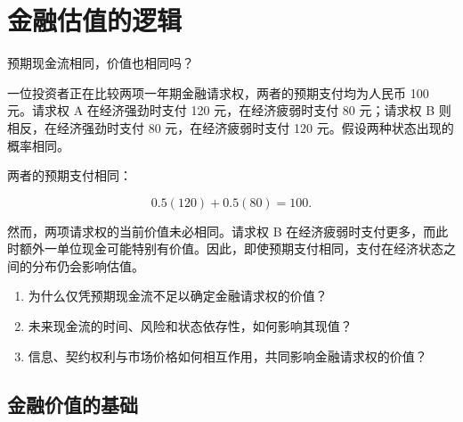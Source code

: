 \chapter{金融估值的逻辑}
\label{chap:The_Logic_of_Financial_Valuation}

\begin{openingcase}{预期现金流相同，价值也相同吗？}

一位投资者正在比较两项一年期金融请求权，两者的预期支付均为人民币 100 元。请求权 A 在经济强劲时支付 120 元，在经济疲弱时支付 80 元；请求权 B 则相反，在经济强劲时支付 80 元，在经济疲弱时支付 120 元。假设两种状态出现的概率相同。

两者的预期支付相同：

\[
0.5(120)+0.5(80)=100.
\]

然而，两项请求权的当前价值未必相同。请求权 B 在经济疲弱时支付更多，而此时额外一单位现金可能特别有价值。因此，即使预期支付相同，支付在经济状态之间的分布仍会影响估值。

\end{openingcase}

\begin{tcolorbox}[
  enhanced,
  colback=FinanceBlue!6,
  colframe=FinanceBlue,
  boxrule=0.6pt,
  sharp corners,
  left=8pt,
  right=8pt,
  top=7pt,
  bottom=7pt,
  before skip=1em,
  after skip=1.6em,
  title=\textbf{核心问题},
  coltitle=white,
  colbacktitle=FinanceBlue,
  fonttitle=\bfseries,
  attach boxed title to top left={xshift=6pt,yshift=-2mm},
  boxed title style={
    boxrule=0pt,
    sharp corners,
    left=5pt,
    right=5pt,
    top=2pt,
    bottom=2pt
  }
]
\begin{enumerate}[
  leftmargin=*,
  label=\textcolor{FinanceBlue}{\textbf{\arabic*.}},
  itemsep=0.55em,
  topsep=0.2em
]

\item 为什么仅凭预期现金流不足以确定金融请求权的价值？

\item 未来现金流的时间、风险和状态依存性，如何影响其现值？

\item 信息、契约权利与市场价格如何相互作用，共同影响金融请求权的价值？

\end{enumerate}
\end{tcolorbox}


\section{金融价值的基础}

